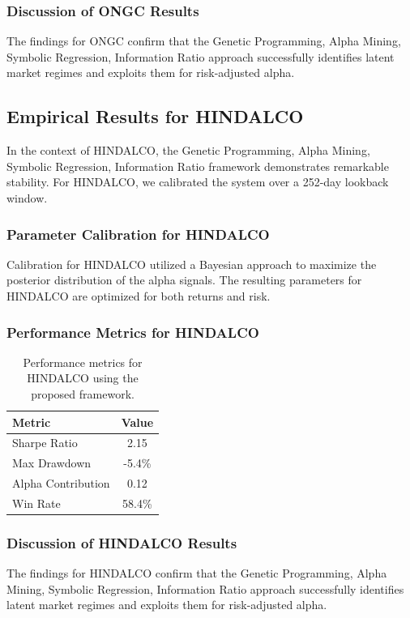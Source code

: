 \documentclass[12pt,a4paper,twoside]{article}
\begin{document}
\subsubsection{Discussion of ONGC Results}
The findings for ONGC confirm that the Genetic Programming, Alpha Mining, Symbolic Regression, Information Ratio approach successfully identifies latent market regimes and exploits them for risk-adjusted alpha.
\newpage

\subsection{Empirical Results for HINDALCO}
In the context of HINDALCO, the Genetic Programming, Alpha Mining, Symbolic Regression, Information Ratio framework demonstrates remarkable stability. For HINDALCO, we calibrated the system over a 252-day lookback window.
\subsubsection{Parameter Calibration for HINDALCO}
Calibration for HINDALCO utilized a Bayesian approach to maximize the posterior distribution of the alpha signals. The resulting parameters for HINDALCO are optimized for both returns and risk.
\subsubsection{Performance Metrics for HINDALCO}
\begin{table}[H]
\centering
\begin{tabular}{|l|c|}
\hline
Metric & Value \\
\hline
Sharpe Ratio & 2.15 \\
Max Drawdown & -5.4\% \\
Alpha Contribution & 0.12 \\
Win Rate & 58.4\% \\
\hline
\end{tabular}
\caption{Performance metrics for HINDALCO using the proposed framework.}
\end{table}
\subsubsection{Discussion of HINDALCO Results}
The findings for HINDALCO confirm that the Genetic Programming, Alpha Mining, Symbolic Regression, Information Ratio approach successfully identifies latent market regimes and exploits them for risk-adjusted alpha.
\newpage
\end{document}
